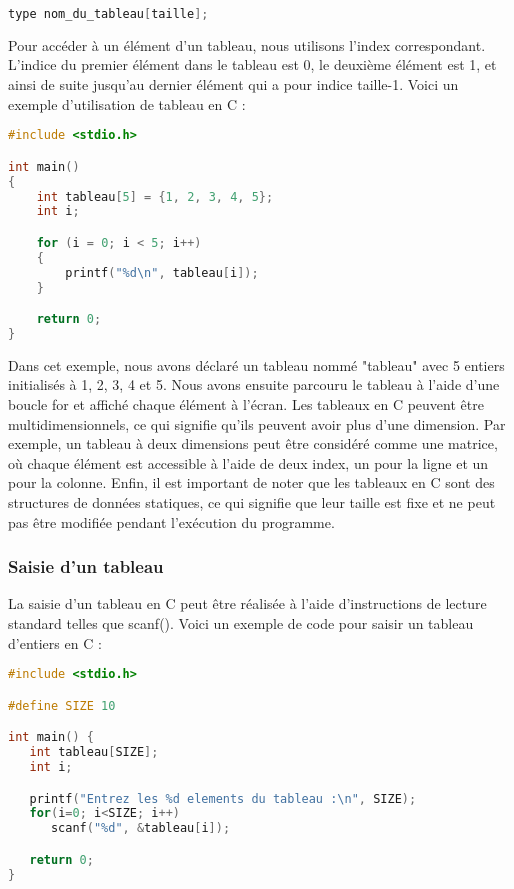 \documentclass{uofa-eng-assignment}
\begin{document}
\begin{lstlisting}[language=c]
type nom_du_tableau[taille];
\end{lstlisting}

\noindent \newline
Pour accéder à un élément d'un tableau, nous utilisons l'index correspondant. L'indice du premier élément dans le tableau est 0, le deuxième élément est 1, et ainsi de suite jusqu'au dernier élément qui a pour indice taille-1.
\newline \newline
Voici un exemple d'utilisation de tableau en C :

\begin{lstlisting}[language=c]
#include <stdio.h>

int main()
{
    int tableau[5] = {1, 2, 3, 4, 5};
    int i;

    for (i = 0; i < 5; i++)
    {
        printf("%d\n", tableau[i]);
    }

    return 0;
}
\end{lstlisting}

\noindent \newline
Dans cet exemple, nous avons déclaré un tableau nommé "tableau" avec 5 entiers initialisés à 1, 2, 3, 4 et 5. Nous avons ensuite parcouru le tableau à l'aide d'une boucle for et affiché chaque élément à l'écran.
\newline \newline
Les tableaux en C peuvent être multidimensionnels, ce qui signifie qu'ils peuvent avoir plus d'une dimension. Par exemple, un tableau à deux dimensions peut être considéré comme une matrice, où chaque élément est accessible à l'aide de deux index, un pour la ligne et un pour la colonne.
\newline \newline
Enfin, il est important de noter que les tableaux en C sont des structures de données statiques, ce qui signifie que leur taille est fixe et ne peut pas être modifiée pendant l'exécution du programme.

\subsubsection{Saisie d'un tableau}
La saisie d'un tableau en C peut être réalisée à l'aide d'instructions de lecture standard telles que scanf(). Voici un exemple de code pour saisir un tableau d'entiers en C :

\begin{lstlisting}[language=c]
#include <stdio.h>

#define SIZE 10

int main() {
   int tableau[SIZE];
   int i;

   printf("Entrez les %d elements du tableau :\n", SIZE);
   for(i=0; i<SIZE; i++)
      scanf("%d", &tableau[i]);

   return 0;
}
\end{lstlisting}
\end{document}
